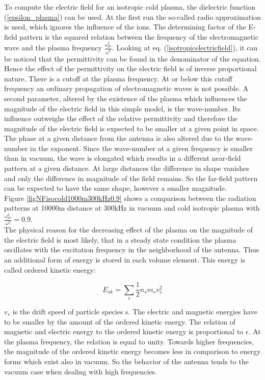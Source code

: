 \documentclass[a4paper,11pt]{thesis}
\begin{document}
To compute the electric field for an isotropic cold plasma, the dielectric function (\ref{epsilon_plasma}) can be used. At the first run the so-called radio approximation is used, which ignores the influence of the ions. The determining factor of the E-field pattern is the squared relation between the frequency of the electromagnetic wave and the plasma frequency $\frac{\omega_{pe}^2}{\omega^2}$. Looking at eq. (\ref{isotropicelectricfield}), it can be noticed that the permittivity can be found in the denominator of the equation. Hence the effect of the permittivity on the electric field is of inverse proportional nature. There is a cutoff at the plasma frequency. At or below this cutoff frequency an ordinary propagation of electromagnetic waves is not possible. A second parameter, altered by the existence of the plasma which influences the magnitude of the electric field in this simple model, is the wave-number. Its influence outweighs the effect of the relative permittivity and therefore the magnitude of the electric field is expected to be smaller at a given point in space. The phase at a given distance from the antenna is also altered due to the wave-number in the exponent. Since the wave-number at a given frequency is smaller than in vacuum, the wave is elongated which results in a different near-field pattern at a given distance. At large distances the difference in shape vanishes and only the difference in magnitude of the field remains. So the far-field pattern can be expected to have the same shape, however a smaller magnitude.\\

Figure \ref{figNFisocold1000m300kHz0.9} shows a comparison between the radiation patterns at 10000m distance at 300kHz in vacuum and cold isotropic plasma with $\frac{\omega_{pe}^2}{\omega^2}=0.9$.\\

The physical reason for the decreasing effect of the plasma on the magnitude of the electric field is most likely, that in a steady state condition the plasma oscillates with the excitation frequency in the neighborhood of the antenna. Thus an additional form of energy is stored in each volume element. This energy is called ordered kinetic energy:

\begin{equation}
    E_{ok}=\sum_s \frac{1}{2} n_s m_s v_s^2
\end{equation}

$v_s$ is the drift speed of particle species s. The electric and magnetic energies have to be smaller by the amount of the ordered kinetic energy. The relation of magnetic and electric energy to the ordered kinetic energy is proportional to $\epsilon$. At the plasma frequency, the relation is equal to unity. Towards higher frequencies, the magnitude of the ordered kinetic energy becomes less in comparison to energy forms which exist also in vacuum. So the behavior of the antenna tends to the vacuum case when dealing with high frequencies.\\
\end{document}
